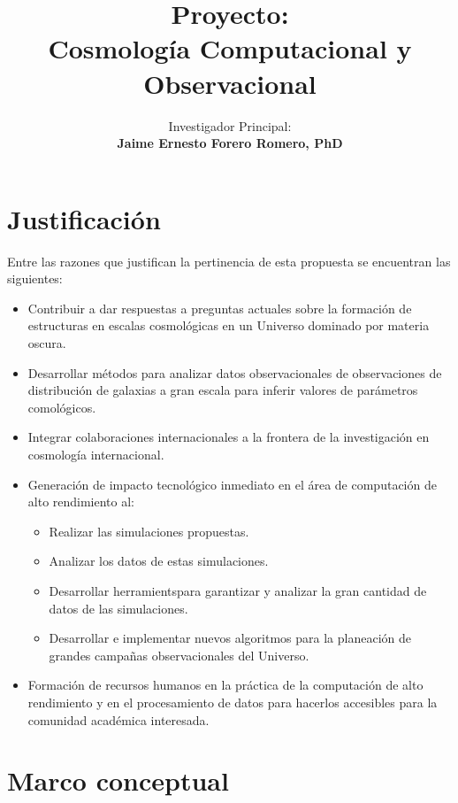 \documentclass[spanish,notitlepage,letterpaper,11pt]{article} %
\title{Proyecto:\\{\bf Cosmolog\'ia Computacional y Observacional}}
\author{Investigador Principal:\\{\bf Jaime Ernesto Forero Romero,
    PhD}\\
}
\begin{document}





\newpage 
\tableofcontents 








\section{Justificaci\'on}

Entre las razones que justifican la pertinencia de esta propuesta se
encuentran las siguientes:

\begin{itemize}
\item Contribuir a dar respuestas a preguntas actuales sobre la
  formaci\'on de estructuras en escalas cosmol\'ogicas en un Universo
  dominado por materia oscura.
\item Desarrollar m\'etodos para analizar datos observacionales de
  observaciones de distribuci\'on de galaxias a gran escala para
  inferir valores de par\'ametros comol\'ogicos.
\item Integrar colaboraciones internacionales a la frontera de la
  investigaci\'on en cosmolog\'ia internacional.
\item Generaci\'on de impacto tecnol\'ogico inmediato en el \'area de
  computaci\'on de alto rendimiento al:
\begin{itemize}
\item Realizar las simulaciones propuestas.
\item Analizar los datos de estas simulaciones.
\item Desarrollar herramientspara garantizar y analizar la
  gran cantidad de datos de las simulaciones.
\item Desarrollar e implementar nuevos algoritmos para la planeaci\'on
  de grandes campa\~nas observacionales del Universo.
\end{itemize}
\item Formaci\'on de recursos humanos en la pr\'actica de la
  computaci\'on de alto rendimiento y en el procesamiento de datos
  para hacerlos accesibles para la comunidad acad\'emica interesada. 
\end{itemize}

\section{Marco conceptual}
\end{document}
